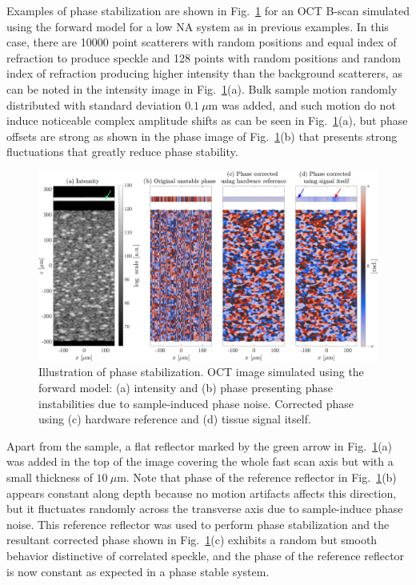Examples of phase stabilization are shown in Fig.~\ref{fig:PhaseStabilization} for an OCT B-scan simulated using the forward model for a low NA system as in previous examples. In this case, there are 10000 point scatterers with random positions and equal index of refraction to produce speckle and 128 points with random positions and random index of refraction producing higher intensity than the background scatterers, as can be noted in the intensity image in Fig.~\ref{fig:PhaseStabilization}(a). Bulk sample motion randomly distributed with standard deviation $0.1~\mu$m was added, and such motion do not induce noticeable complex amplitude shifts as can be seen in Fig.~\ref{fig:PhaseStabilization}(a), but phase offsets are strong as shown in the phase image of Fig.~\ref{fig:PhaseStabilization}(b) that presents strong fluctuations that greatly reduce phase stability.

\begin{figure}[htb!]
	\centering
	\includegraphics[width=\textwidth]{Figures/TheoreticalBasis/PhaseStabilizationComp.pdf}
	\caption[Illustration of phase stabilization.]{Illustration of phase stabilization. OCT image simulated using the forward model: (a) intensity and (b) phase presenting phase instabilities due to sample-induced phase noise. Corrected phase using (c) hardware reference and (d) tissue signal itself.}\label{fig:PhaseStabilization}
\end{figure}

Apart from the sample, a flat reflector marked by the green arrow in Fig.~\ref{fig:PhaseStabilization}(a) was added in the top of the image covering the whole fast scan axis but with a small thickness of $10~\mu$m. Note that phase of the reference reflector in Fig.~\ref{fig:PhaseStabilization}(b) appears constant along depth because no motion artifacts affects this direction, but it fluctuates randomly across the transverse axis due to sample-induce phase noise. This reference reflector was used to perform phase stabilization and the resultant corrected phase shown in Fig.~\ref{fig:PhaseStabilization}(c) exhibits a random but smooth behavior distinctive of correlated speckle, and the phase of the reference reflector is now constant as expected in a phase stable system.

